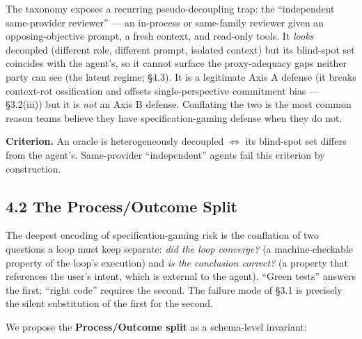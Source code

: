 \documentclass[
  11pt,
]{article}
\begin{document}
The taxonomy exposes a recurring pseudo-decoupling trap: the
``independent same-provider reviewer'' --- an in-process or same-family
reviewer given an opposing-objective prompt, a fresh context, and
read-only tools. It \emph{looks} decoupled (different role, different
prompt, isolated context) but its blind-spot set coincides with the
agent's, so it cannot surface the proxy-adequacy gaps neither party can
see (the latent regime; §4.3). It is a legitimate Axis A defense (it
breaks context-rot ossification and offsets single-perspective
commitment bias --- §3.2(iii)) but it is \emph{not} an Axis B defense.
Conflating the two is the most common reason teams believe they have
specification-gaming defense when they do not.

\textbf{Criterion.} An oracle is heterogeneously decoupled $\Longleftrightarrow$ its
blind-spot set differs from the agent's. Same-provider ``independent''
agents fail this criterion by construction.

\subsection{4.2 The Process/Outcome
Split}\label{the-processoutcome-split}

The deepest encoding of specification-gaming risk is the conflation of
two questions a loop must keep separate: \emph{did the loop converge?}
(a machine-checkable property of the loop's execution) and \emph{is the
conclusion correct?} (a property that references the user's intent,
which is external to the agent). ``Green tests'' answers the first;
``right code'' requires the second. The failure mode of §3.1 is
precisely the silent substitution of the first for the second.

We propose the \textbf{Process/Outcome split} as a schema-level
invariant:
\end{document}
